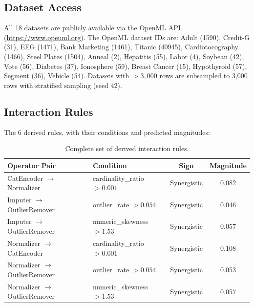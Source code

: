 \documentclass[preprint]{article}
\begin{document}
\subsection{Dataset Access}

All 18 datasets are publicly available via the OpenML API (\url{https://www.openml.org}). The OpenML dataset IDs are: Adult (1590), Credit-G (31), EEG (1471), Bank Marketing (1461), Titanic (40945), Cardiotocography (1466), Steel Plates (1504), Anneal (2), Hepatitis (55), Labor (4), Soybean (42), Vote (56), Diabetes (37), Ionosphere (59), Breast Cancer (15), Hypothyroid (57), Segment (36), Vehicle (54). Datasets with $> 3{,}000$ rows are subsampled to 3,000 rows with stratified sampling (seed 42).

\subsection{Interaction Rules}

The 6 derived rules, with their conditions and predicted magnitudes:

\begin{table}[h]
\centering
\small
\begin{tabular}{llcc}
\toprule
Operator Pair & Condition & Sign & Magnitude \\
\midrule
CatEncoder $\rightarrow$ Normalizer & cardinality\_ratio $> 0.001$ & Synergistic & 0.082 \\
Imputer $\rightarrow$ OutlierRemover & outlier\_rate $> 0.054$ & Synergistic & 0.046 \\
Imputer $\rightarrow$ OutlierRemover & numeric\_skewness $> 1.53$ & Synergistic & 0.057 \\
Normalizer $\rightarrow$ CatEncoder & cardinality\_ratio $> 0.001$ & Synergistic & 0.108 \\
Normalizer $\rightarrow$ OutlierRemover & outlier\_rate $> 0.054$ & Synergistic & 0.053 \\
Normalizer $\rightarrow$ OutlierRemover & numeric\_skewness $> 1.53$ & Synergistic & 0.057 \\
\bottomrule
\end{tabular}
\caption{Complete set of derived interaction rules.}
\label{tab:rules}
\end{table}
\end{document}
